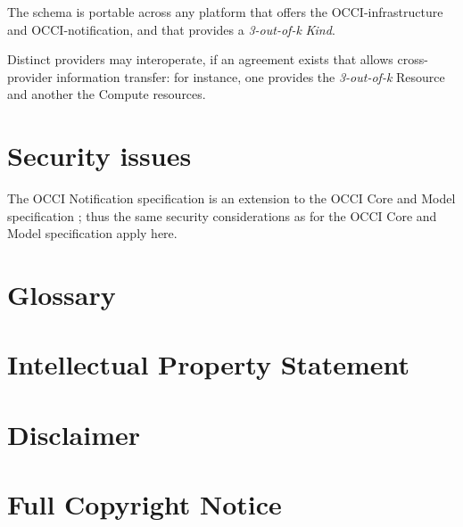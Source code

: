\documentclass[10pt,a4paper]{article}
\begin{document}
The schema is portable across any platform that offers the OCCI-infrastructure and OCCI-notification, and that provides a  {\em 3-out-of-k} {\em Kind}.

Distinct providers may interoperate, if an agreement exists that allows cross-provider information transfer: for instance, one provides the  {\em 3-out-of-k} Resource and another the Compute resources.

\section{Security issues}
The OCCI Notification specification is an extension to the OCCI Core
and Model specification \cite{occi:core}; thus the same security
considerations as for the OCCI Core and Model specification apply
here.

\section{Glossary}
\label{sec:glossary}

 
%

\section{Intellectual Property Statement}


\section{Disclaimer}


\section{Full Copyright Notice}




\end{document}
